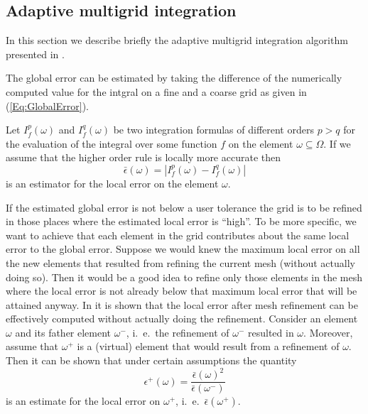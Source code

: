 \documentclass[11pt,a4paper,headinclude,footinclude,DIV16,normalheadings]{scrreprt}
\begin{document}
\subsection{Adaptive multigrid integration}

In this section we describe briefly the adaptive multigrid integration
algorithm presented in \cite{Deuflhard93}.


The global error can be estimated by taking the difference of the numerically
computed value for the intgral on a fine and a coarse grid as given in
(\ref{Eq:GlobalError}). 


Let $I_f^p(\omega)$ and $I_f^q(\omega)$ be two integration formulas of
different orders $p>q$ for the evaluation of the integral over some
function $f$ on the element $\omega\subseteq\Omega$. If we assume that
the higher order rule is locally more accurate then 
\begin{equation}
\bar{\epsilon}(\omega) = |I_f^p(\omega)-I_f^q(\omega)|
\end{equation}
is an estimator for the local error on the element $\omega$.


If the estimated global error is not below a user tolerance the grid
is to be refined in those places where the estimated local error is
``high''. To be more specific, we want to achieve that each element in
the grid contributes about the same local error to the global
error. Suppose we would knew the maximum local error on all the new elements
that resulted from refining the current mesh (without actually doing
so). Then it would be a good idea to refine only those elements in the
mesh where the local error is not already below that maximum local
error that will be attained anyway.
In \cite{Deuflhard93} it is shown that the local error after mesh
refinement can be effectively computed without actually doing the
refinement. Consider an element $\omega$ and its father element
$\omega^-$, i.~e.~the refinement of  $\omega^-$ resulted in
$\omega$. Moreover, assume that $\omega^+$ is a (virtual) element that
would result from a refinement of $\omega$. Then it can be shown that 
under certain assumptions the quantity
\begin{equation}
\epsilon^+(\omega) = \frac{\bar{\epsilon}(\omega)^2}{\bar{\epsilon}(\omega^-)}
\end{equation}
is an estimate for the local error on $\omega^+$,
i.~e.~$\bar{\epsilon}(\omega^+)$. 
\end{document}
